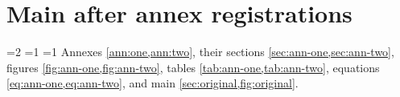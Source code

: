 \documentclass{article}
\begin{document}
\section{Main after annex registrations}\label{sec:final}
\ifnum\value{chapter}=2\else{}\fi
\ifnum\value{section}=1\else{}\fi
\ifnum\value{figure}=1\else{}\fi
Annexes \cref{ann:one,ann:two}, their sections
\cref{sec:ann-one,sec:ann-two}, figures \cref{fig:ann-one,fig:ann-two},
tables \cref{tab:ann-one,tab:ann-two}, equations
\cref{eq:ann-one,eq:ann-two}, and main \cref{sec:original,fig:original}.
\end{document}
